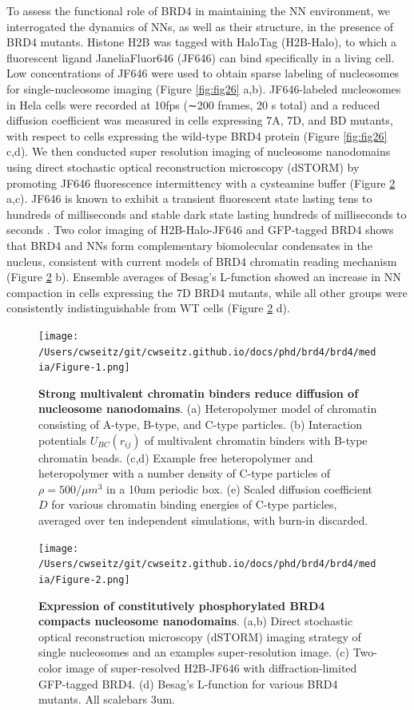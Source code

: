 To assess the functional role of BRD4 in maintaining the NN environment, we interrogated the dynamics of NNs, as well as their structure, in the presence of BRD4 mutants. Histone H2B was tagged with HaloTag \parencite{Los2008} (H2B-Halo), to which a fluorescent ligand JaneliaFluor646 (JF646) can bind speciﬁcally in a living cell. Low concentrations of JF646 were used to obtain sparse labeling of nucleosomes for single-nucleosome imaging (Figure \ref{fig:fig26} a,b). JF646-labeled nucleosomes in Hela cells were recorded at 10fps (∼200 frames, 20 s total) and a reduced diffusion coefficient was measured in cells expressing 7A, 7D, and BD mutants, with respect to cells expressing the wild-type BRD4 protein (Figure \ref{fig:fig26} c,d). We then conducted super resolution imaging of nucleosome nanodomains using direct stochastic optical reconstruction microscopy (dSTORM) by promoting JF646 fluorescence intermittency with a cysteamine buffer (Figure \ref{fig:fig25} a,c). JF646 is known to exhibit a transient fluorescent state lasting tens to hundreds of milliseconds and stable dark state lasting hundreds of milliseconds to seconds \parencite{Grimm2015}. Two color imaging of H2B-Halo-JF646 and GFP-tagged BRD4 shows that BRD4 and NNs form complementary biomolecular condensates in the nucleus, consistent with current models of BRD4 chromatin reading mechanism (Figure \ref{fig:fig25} b). Ensemble averages of Besag’s L-function showed an increase in NN compaction in cells expressing the 7D BRD4 mutants, while all other groups were consistently indistinguishable from WT cells (Figure \ref{fig:fig25} d).  

\begin{figure}[t]
\texttt{[image: /Users/cwseitz/git/cwseitz.github.io/docs/phd/brd4/brd4/media/Figure-1.png]}
\caption{\textbf{Strong multivalent chromatin binders reduce diffusion of nucleosome nanodomains}. (a) Heteropolymer model of chromatin consisting of A-type, B-type, and C-type particles. (b) Interaction potentials $U_{BC}(r_{ij})$ of multivalent chromatin binders with B-type chromatin beads. (c,d) Example free heteropolymer and heteropolymer with a number density of C-type particles of $\rho=500/\mu m^3$ in a 10um periodic box. (e) Scaled diffusion coefficient $D$ for various chromatin binding energies of C-type particles, averaged over ten independent simulations, with burn-in discarded.}
\label{fig:fig24}
\end{figure}

\begin{figure}[t]
\texttt{[image: /Users/cwseitz/git/cwseitz.github.io/docs/phd/brd4/brd4/media/Figure-2.png]}
\caption{\textbf{Expression of constitutively phosphorylated BRD4 compacts nucleosome nanodomains}. (a,b) Direct stochastic optical reconstruction microscopy (dSTORM) imaging strategy of single nucleosomes and an examples super-resolution image. (c) Two-color image of super-resolved H2B-JF646 with diffraction-limited GFP-tagged BRD4. (d) Besag’s L-function for various BRD4 mutants. All scalebars 3um.}
\label{fig:fig25}
\end{figure}


